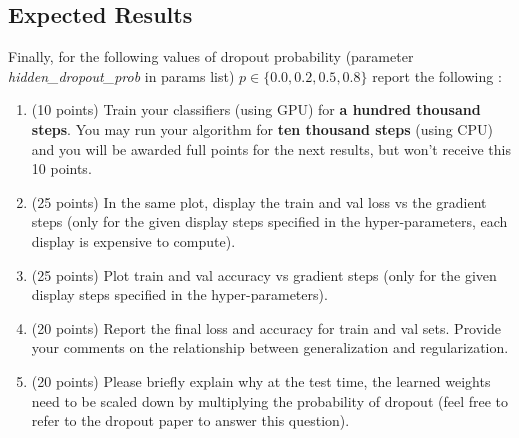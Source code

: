 \documentclass{article}
\begin{document}
\subsection{Expected Results}
Finally, for the following values of dropout probability (parameter \textit{hidden\_dropout\_prob} in params list) $p\in\{0.0, 0.2, 0.5, 0.8\}$ report the following :
\begin{enumerate}[a]

    \item (10 points) Train your classifiers (using GPU) for \textbf{a hundred thousand steps}. You may run your algorithm for \textbf{ten thousand steps} (using CPU) and you will be awarded full points for the next results, but won't receive this 10 points.
    
    \item (25 points) In the same plot, display the train and val loss vs the gradient steps (only for the given display steps specified in the hyper-parameters, each display is expensive to compute).

    \item (25 points) Plot train and val accuracy vs gradient steps (only for the given display steps specified in the hyper-parameters).
    

    \item (20 points) Report the final loss and accuracy for train and val sets. Provide your comments on the relationship between generalization and regularization.
    
    \item (20 points) Please briefly explain why at the test time, the learned weights need to be scaled down by multiplying the probability of dropout (feel free to refer to the dropout paper to answer this question).
    
\end{enumerate}
\end{document}
